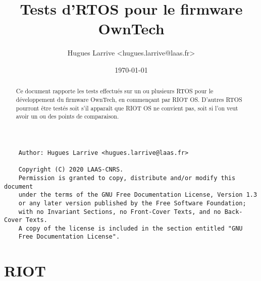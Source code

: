 \documentclass[a4paper,12pt, twoside]{article}
\title{Tests d'RTOS pour le firmware OwnTech}
\author{Hugues Larrive <hugues.larrive@laas.fr>}
\date{\today}	%
\begin{document}
\maketitle{}


\begin{abstract}
	Ce document rapporte les tests effectués sur un ou plusieurs RTOS pour le
	développement du firmware OwnTech, en commençant par RIOT OS. D'autres RTOS
	pourront être testés soit s'il apparaît que RIOT OS ne convient pas, soit si l'on
	veut avoir un ou des points de comparaison.
\end{abstract}


{\footnotesize
\begin{verbatim}
    Author: Hugues Larrive <hugues.larrive@laas.fr>

	Copyright (C) 2020 LAAS-CNRS.
	Permission is granted to copy, distribute and/or modify this document
	under the terms of the GNU Free Documentation License, Version 1.3
	or any later version published by the Free Software Foundation;
	with no Invariant Sections, no Front-Cover Texts, and no Back-Cover Texts.
	A copy of the license is included in the section entitled "GNU
	Free Documentation License".
\end{verbatim}
}

\newpage

\renewcommand{\contentsname}{Sommaire}
\tableofcontents{}




\section{RIOT}




\end{document}
